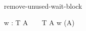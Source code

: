 \begin{circustimelaw}{remove-unused-wait-block}
\begin{circusaction*}
  \circwaitblock w : T \circspot A ~ \equiv ~ \circwait T \circseq A \; \provided \; w \notin \FV(A)
\end{circusaction*}
\end{circustimelaw}
